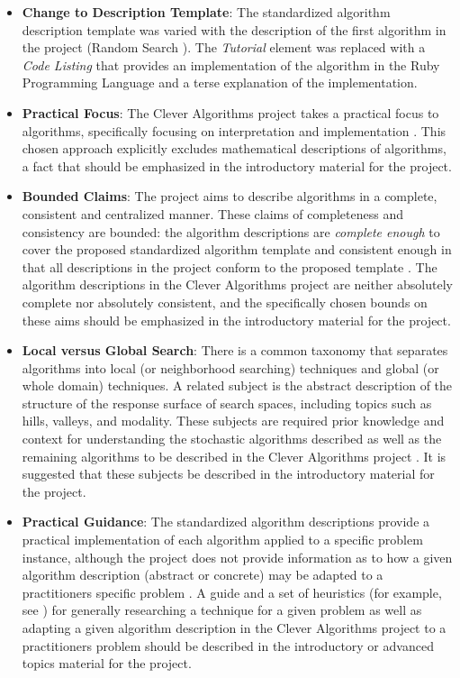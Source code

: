 \documentclass[a4paper, 11pt]{article}
\begin{document}
\begin{itemize}
	\item \textbf{Change to Description Template}: The standardized algorithm description template \cite{Brownlee2010a} was varied with the description of the first algorithm in the project (Random Search \cite{Brownlee2010g}). The \emph{Tutorial} element was replaced with a \emph{Code Listing} that provides an implementation of the algorithm in the Ruby Programming Language and a terse explanation of the implementation. 	
	\item \textbf{Practical Focus}: The Clever Algorithms project takes a practical focus to algorithms, specifically focusing on interpretation and implementation \cite{Brownlee2010g}. This chosen approach explicitly excludes mathematical descriptions of algorithms, a fact that should be emphasized in the introductory material for the project. 
	\item \textbf{Bounded Claims}: The project aims to describe algorithms in a complete, consistent and centralized manner. These claims of completeness and consistency are bounded: the algorithm descriptions are \emph{complete enough} to cover the proposed standardized algorithm template and consistent enough in that all descriptions in the project conform to the proposed template \cite{Brownlee2010g}. The algorithm descriptions in the Clever Algorithms project are neither absolutely complete nor absolutely consistent, and the specifically chosen bounds on these aims should be emphasized in the introductory material for the project.
	\item \textbf{Local versus Global Search}: There is a common taxonomy that separates algorithms into local (or neighborhood searching) techniques and global (or whole domain) techniques. A related subject is the abstract description of the structure of the response surface of search spaces, including topics such as hills, valleys, and modality. These subjects are required prior knowledge and context for understanding the stochastic algorithms described as well as the remaining algorithms to be described in the Clever Algorithms project \cite{Brownlee2010h}. It is suggested that these subjects be described in the introductory material for the project.
	\item \textbf{Practical Guidance}: The standardized algorithm descriptions provide a practical implementation of each algorithm applied to a specific problem instance, although the project does not provide information as to how a given algorithm description (abstract or concrete) may be adapted to a practitioners specific problem \cite{Brownlee2010i}. A guide and a set of heuristics (for example, see \cite{Gendreau2003}) for generally researching a technique for a given problem as well as adapting a given algorithm description in the Clever Algorithms project to a practitioners problem should be described in the introductory or advanced topics material for the project.

\end{itemize}
\end{document}
